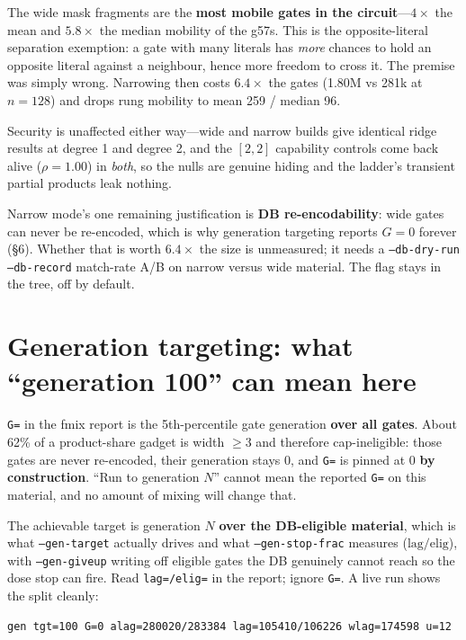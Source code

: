 \documentclass[11pt]{article}
\begin{document}
The wide mask fragments are the \textbf{most mobile gates in the circuit}---$4\times$
the mean and $5.8\times$ the median mobility of the g57s. This is the
opposite-literal separation exemption: a gate with many literals has \emph{more}
chances to hold an opposite literal against a neighbour, hence more freedom to
cross it. The premise was simply wrong. Narrowing then costs $\mathbf{6.4\times}$
the gates (1.80M vs 281k at $n{=}128$) and drops rung mobility to mean 259 /
median 96.

Security is unaffected either way---wide and narrow builds give identical ridge
results at degree 1 and degree 2, and the $[2,2]$ capability controls come back
alive ($\rho=1.00$) in \emph{both}, so the nulls are genuine hiding and the
ladder's transient partial products leak nothing.

Narrow mode's one remaining justification is \textbf{DB re-encodability}: wide
gates can never be re-encoded, which is why generation targeting reports $G=0$
forever (\S6). Whether that is worth $6.4\times$ the size is unmeasured; it needs
a \texttt{--db-dry-run --db-record} match-rate A/B on narrow versus wide
material. The flag stays in the tree, off by default.

\section{Generation targeting: what ``generation 100'' can mean here}

\texttt{G=} in the fmix report is the 5th-percentile gate generation
\textbf{over all gates}. About 62\% of a product-share gadget is width $\ge3$ and
therefore cap-ineligible: those gates are never re-encoded, their generation
stays 0, and \texttt{G=} is pinned at 0 \textbf{by construction}. ``Run to
generation $N$'' cannot mean the reported \texttt{G=} on this material, and no
amount of mixing will change that.

The achievable target is generation $N$ \textbf{over the DB-eligible material},
which is what \texttt{--gen-target} actually drives and what
\texttt{--gen-stop-frac} measures ($\mathrm{lag}/\mathrm{elig}$), with
\texttt{--gen-giveup} writing off eligible gates the DB genuinely cannot reach so
the dose stop can fire. Read \texttt{lag=/elig=} in the report; ignore
\texttt{G=}. A live run shows the split cleanly:

\begin{verbatim}
gen tgt=100 G=0 alag=280020/283384 lag=105410/106226 wlag=174598 u=12
\end{verbatim}
\end{document}
